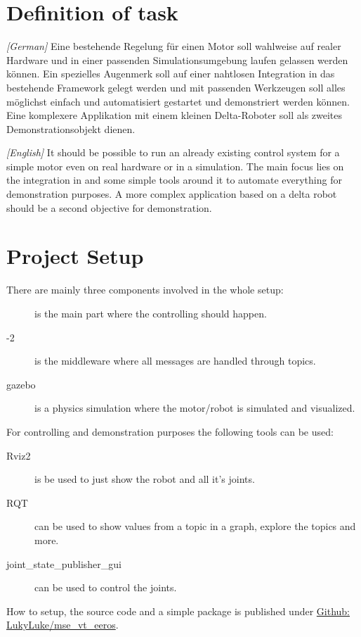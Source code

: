 
\section[Definition of task]{Definition of task} \label{sec:definition-of-task}

\textit{[German]} Eine bestehende Regelung f\"ur einen Motor soll wahlweise auf realer Hardware und in einer passenden Simulationsumgebung laufen gelassen werden k\"onnen.
Ein spezielles Augenmerk soll auf einer nahtlosen Integration in das bestehende  Framework gelegt werden und mit passenden Werkzeugen soll alles m\"oglichst einfach und automatisiert gestartet und demonstriert werden k\"onnen.
Eine komplexere Applikation mit einem kleinen Delta-Roboter soll als zweites Demonstrationsobjekt dienen.

\textit{[English]} It should be possible to run an already existing control system for a simple motor even on real hardware or in a simulation.
The main focus lies on the integration in  and some simple tools around it to automate everything for demonstration purposes.
A more complex application based on a delta robot should be a second objective for demonstration.


\section[Setup]{Project Setup} \label{sec:project-setup}

There are mainly three components involved in the whole setup:

\begin{description}
    \item[] is the main part where the controlling should happen.
    \item[-2] is the middleware where all messages are handled through topics.
    \item[\Gls{gazebo}] is a physics simulation where the motor/robot is simulated and visualized.
\end{description}

For controlling and demonstration purposes the following tools can be used:

\begin{description}
    \item[Rviz2] is be used to just show the robot and all it's joints.
    \item[RQT] can be used to show values from a topic in a graph, explore the topics and more.
    \item[joint\_state\_publisher\_gui] can be used to control the joints.
\end{description}

How to setup, the source code and a simple package is published under \href{https://github.com/LukyLuke/mse_vt_eeros}{Github: LukyLuke/mse\_vt\_eeros}.

